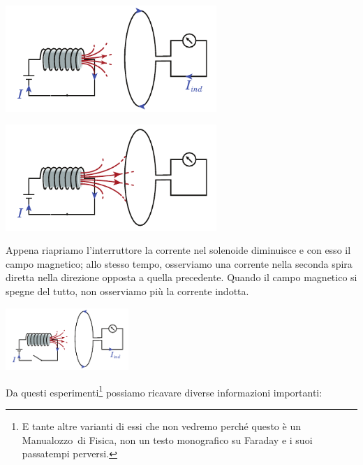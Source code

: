 \begin{itemize}
\begin{minipage}{0.49\textwidth}
			\begin{center}
				\includegraphics[width=0.6\textwidth]{images/chp10/chp10esperimento3b.pdf}
			\end{center}
		\end{minipage}
		\begin{minipage}{0.49\textwidth}
			\begin{center}
				\includegraphics[width=0.6\textwidth]{images/chp10/chp10esperimento3c.pdf}
			\end{center}
		\end{minipage}
	Appena riapriamo l'interruttore la corrente nel solenoide diminuisce e con esso il campo magnetico; allo stesso tempo, osserviamo una corrente nella seconda spira diretta nella direzione opposta a quella precedente. Quando il campo magnetico si spegne del tutto, non osserviamo più la corrente indotta.
	\begin{center}
		\includegraphics[width=0.35\textwidth]{images/chp10/chp10esperimento3d.pdf}
	\end{center}
\end{itemize}
Da questi esperimenti\footnote{E tante altre varianti di essi che non vedremo perché questo è un Manualozzo\texttrademark\ di Fisica, non un testo monografico su Faraday e i suoi passatempi perversi.} possiamo ricavare diverse informazioni importanti:
